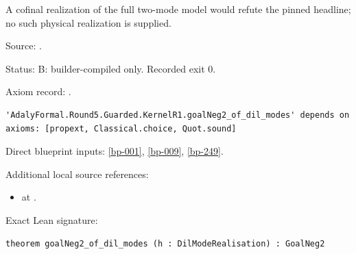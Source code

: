 \begin{theorem}[bp-057]
\label{bp-057}
\leanok
A cofinal realization of the full two-mode model would refute the pinned headline; no such physical realization is supplied.

\par Source: \texttt{}.
\par Status: B: builder-compiled only. Recorded exit 0.
\par Axiom record: \texttt{}.
\begin{verbatim}
'AdalyFormal.Round5.Guarded.KernelR1.goalNeg2_of_dil_modes' depends on axioms: [propext, Classical.choice, Quot.sound]
\end{verbatim}
\par Direct blueprint inputs: \ref{bp-001}, \ref{bp-009}, \ref{bp-249}.
\par Additional local source references:
\begin{itemize}
\item \texttt{} at \texttt{}.
\end{itemize}
\par Exact Lean signature:
\begin{verbatim}
theorem goalNeg2_of_dil_modes (h : DilModeRealisation) : GoalNeg2
\end{verbatim}
\end{theorem}

